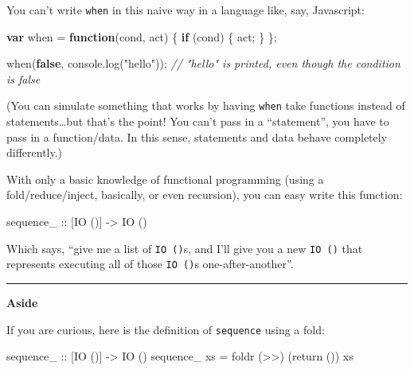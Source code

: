 \documentclass[]{article}
\newenvironment{Shaded}{}{}
\newcommand{\KeywordTok}[1]{\textcolor[rgb]{0.00,0.44,0.13}{\textbf{{#1}}}}
\newcommand{\DataTypeTok}[1]{\textcolor[rgb]{0.56,0.13,0.00}{{#1}}}
\newcommand{\StringTok}[1]{\textcolor[rgb]{0.25,0.44,0.63}{{#1}}}
\newcommand{\CommentTok}[1]{\textcolor[rgb]{0.38,0.63,0.69}{\textit{{#1}}}}
\newcommand{\OtherTok}[1]{\textcolor[rgb]{0.00,0.44,0.13}{{#1}}}
\newcommand{\FunctionTok}[1]{\textcolor[rgb]{0.02,0.16,0.49}{{#1}}}
\newcommand{\VariableTok}[1]{\textcolor[rgb]{0.10,0.09,0.49}{{#1}}}
\newcommand{\ControlFlowTok}[1]{\textcolor[rgb]{0.00,0.44,0.13}{\textbf{{#1}}}}
\newcommand{\OperatorTok}[1]{\textcolor[rgb]{0.40,0.40,0.40}{{#1}}}
\newcommand{\AttributeTok}[1]{\textcolor[rgb]{0.49,0.56,0.16}{{#1}}}
\newcommand{\NormalTok}[1]{{#1}}
\begin{document}
You can't write \texttt{when} in this naive way in a language like, say,
Javascript:

\begin{Shaded}
\begin{Highlighting}[]
\KeywordTok{var} \NormalTok{when }\OperatorTok{=} \KeywordTok{function}\NormalTok{(cond}\OperatorTok{,} \NormalTok{act) }\OperatorTok{\{} \ControlFlowTok{if} \NormalTok{(cond) }\OperatorTok{\{} \NormalTok{act}\OperatorTok{;} \OperatorTok{\}} \OperatorTok{\};}

\AttributeTok{when}\NormalTok{(}\KeywordTok{false}\OperatorTok{,} \VariableTok{console}\NormalTok{.}\AttributeTok{log}\NormalTok{(}\StringTok{"hello"}\NormalTok{))}\OperatorTok{;}
\CommentTok{// "hello" is printed, even though the condition is false}
\end{Highlighting}
\end{Shaded}

(You can simulate something that works by having \texttt{when} take
functions instead of statements\ldots{}but that's the point! You can't
pass in a ``statement'', you have to pass in a function/data. In this
sense, statements and data behave completely differently.)

With only a basic knowledge of functional programming (using a
fold/reduce/inject, basically, or even recursion), you can easy write
this function:

\begin{Shaded}
\begin{Highlighting}[]
\NormalTok{sequence_}\OtherTok{ ::} \NormalTok{[}\DataTypeTok{IO} \NormalTok{()] }\OtherTok{->} \DataTypeTok{IO} \NormalTok{()}
\end{Highlighting}
\end{Shaded}

Which says, ``give me a list of \texttt{IO\ ()}s, and I'll give you a
new \texttt{IO\ ()} that represents executing all of those
\texttt{IO\ ()}s one-after-another''.

\begin{center}\rule{0.5\linewidth}{\linethickness}\end{center}

\textbf{Aside}

If you are curious, here is the definition of \texttt{sequence} using a
fold:

\begin{Shaded}
\begin{Highlighting}[]
\NormalTok{sequence_}\OtherTok{ ::} \NormalTok{[}\DataTypeTok{IO} \NormalTok{()] }\OtherTok{->} \DataTypeTok{IO} \NormalTok{()}
\NormalTok{sequence_ xs }\FunctionTok{=} \NormalTok{foldr (}\FunctionTok{>>}\NormalTok{) (return ()) xs}
\end{Highlighting}
\end{Shaded}
\end{document}

